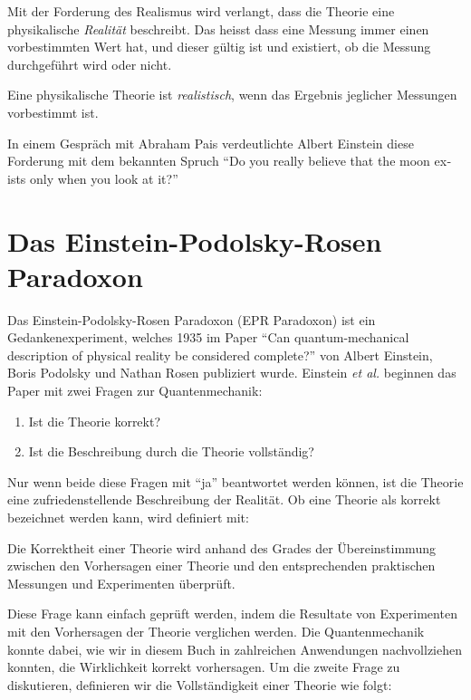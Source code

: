 \begin{refsection}
Mit der Forderung des Realismus wird verlangt, dass die Theorie eine
physikalische \emph{Realit\"at} beschreibt.
Das heisst dass eine Messung immer einen vorbestimmten Wert hat, und dieser
g\"ultig ist und existiert, ob die Messung durchgef\"uhrt wird oder nicht.

\begin{definition}\label{def:bell:}
    Eine physikalische Theorie ist \emph{realistisch}, wenn das Ergebnis
    jeglicher Messungen vorbestimmt ist.
\end{definition}

In einem Gespr\"ach mit Abraham Pais verdeutlichte Albert Einstein diese
Forderung mit dem bekannten Spruch
\foreignquote{english}{Do you really believe that the moon exists only when you look at it?}\cite{Bell:Pais1979}



\section{Das Einstein-Podolsky-Rosen Paradoxon\label{section:bell:epr}}
Das Einstein-Podolsky-Rosen Paradoxon (EPR Paradoxon) ist ein 
Gedankenexperiment, welches 1935 im Paper \cite{Bell:Einstein1935}
\enquote{Can quantum-mechanical description of physical reality be considered complete?}
von Albert Einstein, Boris Podolsky und Nathan Rosen publiziert wurde.
Einstein \emph{et al.} beginnen das Paper mit zwei Fragen zur
Quantenmechanik:

\begin{enumerate}
    \item Ist die Theorie korrekt?
    \item Ist die Beschreibung durch die Theorie vollst\"andig?
\end{enumerate}

Nur wenn beide diese Fragen mit \enquote{ja} beantwortet werden k\"onnen, 
ist die Theorie eine zufriedenstellende Beschreibung der Realit\"at.
Ob eine Theorie als korrekt bezeichnet werden kann, wird definiert mit:

\begin{definition}\label{def:bell:Korrektheit}
    Die Korrektheit einer Theorie wird anhand des Grades der \"Ubereinstimmung
    zwischen den Vorhersagen einer Theorie und den entsprechenden praktischen
    Messungen und Experimenten \"uberpr\"uft.
\end{definition}

Diese Frage kann einfach gepr\"uft werden, indem die Resultate von
Experimenten mit den Vorhersagen der Theorie verglichen werden. 
Die Quantenmechanik konnte dabei, wie wir in diesem Buch in zahlreichen
Anwendungen nachvollziehen konnten, die Wirklichkeit korrekt vorhersagen. 
Um die zweite Frage zu diskutieren, definieren wir die Vollst\"andigkeit einer
Theorie wie folgt:


\end{refsection}
